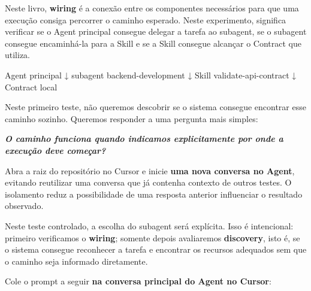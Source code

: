 \documentclass[
  10pt,
  a4paper,
  oneside]{book}
\newenvironment{Shaded}{}{}
\newcommand{\NormalTok}[1]{#1}
\renewenvironment{quote}
  {\def\FrameCommand{\fboxsep=10pt\colorbox{LightBlue}}%
   \MakeFramed{\advance\hsize-\width\FrameRestore}\itshape}
  {\endMakeFramed}
\renewenvironment{Shaded}{\begin{snugshade}}{\end{snugshade}}%
\begin{document}
Neste livro, \textbf{wiring} é a conexão entre os componentes
necessários para que uma execução consiga percorrer o caminho esperado.
Neste experimento, significa verificar se o Agent principal consegue
delegar a tarefa ao subagent, se o subagent consegue encaminhá-la para a
Skill e se a Skill consegue alcançar o Contract que utiliza.

\begin{Shaded}
\begin{Highlighting}[]
\NormalTok{Agent principal}
\NormalTok{      ↓}
\NormalTok{subagent backend{-}development}
\NormalTok{      ↓}
\NormalTok{Skill validate{-}api{-}contract}
\NormalTok{      ↓}
\NormalTok{Contract local}
\end{Highlighting}
\end{Shaded}

Neste primeiro teste, não queremos descobrir se o sistema consegue
encontrar esse caminho sozinho. Queremos responder a uma pergunta mais
simples:

\begin{quote}
\textbf{O caminho funciona quando indicamos explicitamente por onde a
execução deve começar?}
\end{quote}

Abra a raiz do repositório no Cursor e inicie \textbf{uma nova conversa
no Agent}, evitando reutilizar uma conversa que já contenha contexto de
outros testes. O isolamento reduz a possibilidade de uma resposta
anterior influenciar o resultado observado.

Neste teste controlado, a escolha do subagent será explícita. Isso é
intencional: primeiro verificamos o \textbf{wiring}; somente depois
avaliaremos \textbf{discovery}, isto é, se o sistema consegue reconhecer
a tarefa e encontrar os recursos adequados sem que o caminho seja
informado diretamente.

Cole o prompt a seguir \textbf{na conversa principal do Agent no
Cursor}:
\end{document}
